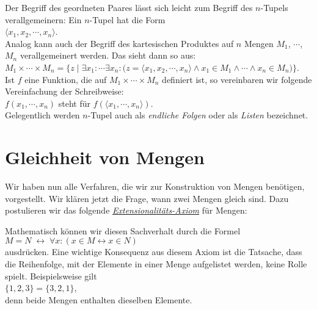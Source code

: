Der Begriff des geordneten Paares l\"{a}sst sich leicht zum Begriff des $n$-Tupels verallgemeinern:
Ein $n$-Tupel hat die Form \\[0.2cm]
\hspace*{1.3cm} $\langle x_1, x_2, \cdots, x_n \rangle$. \\[0.2cm]
Analog kann auch der Begriff des kartesischen Produktes auf $n$ Mengen $M_1$, $\cdots$, $M_n$
verallgemeinert werden. Das sieht dann so aus: \\[0.2cm]
\hspace*{1.3cm}
$M_1 \times \cdots \times M_n =
  \big\{ z \mid \exists x_1\colon \cdots \exists x_n \colon 
    \bigl( z = \langle x_1,x_2,\cdots,x_n \rangle \wedge x_1\in M_1 \wedge \cdots \wedge x_n \in M_n\bigr) 
  \big\}
$. 
\\[0.2cm]
Ist $f$ eine Funktion, die auf $M_1 \times \cdots \times M_n$ definiert ist,
so vereinbaren wir folgende Vereinfachung der Schreibweise: \\[0.2cm]
\hspace*{1.3cm} $f(x_1, \cdots, x_n)$ steht f\"{u}r $f(\langle x_1, \cdots,
x_n\rangle)$. \\[0.2cm]
Gelegentlich werden $n$-Tupel auch als \emph{endliche Folgen} oder als
\emph{Listen} bezeichnet.  

\section{Gleichheit von Mengen}
Wir haben nun alle Verfahren, die wir zur Konstruktion von Mengen ben\"{o}tigen, vorgestellt.
Wir kl\"{a}ren jetzt die Frage, wann zwei Mengen gleich sind.  Dazu postulieren wir das folgende 
\href{https://en.wikipedia.org/wiki/Axiom_of_extensionality}{\emph{Extensionalit\"{a}ts-Axiom}}
f\"{u}r Mengen: 
\vspace*{0.2cm}

\colorbox{red}{}
\vspace{0.2cm}

Mathematisch k\"{o}nnen wir diesen Sachverhalt durch die Formel
\\[0.2cm]
\hspace*{1.3cm} $M = N \;\leftrightarrow\; \forall x: (x \in M \leftrightarrow x \in N)$ 
\\[0.2cm]
ausdr\"{u}cken.  Eine wichtige Konsequenz aus diesem Axiom ist die Tatsache, dass die Reihenfolge, mit der
Elemente in einer Menge aufgelistet werden, keine Rolle spielt.  Beispielsweise gilt \\[0.2cm]
\hspace*{1.3cm} $\{1,2,3\} = \{3,2,1\}$, \\[0.2cm]
denn beide Mengen enthalten dieselben Elemente.

